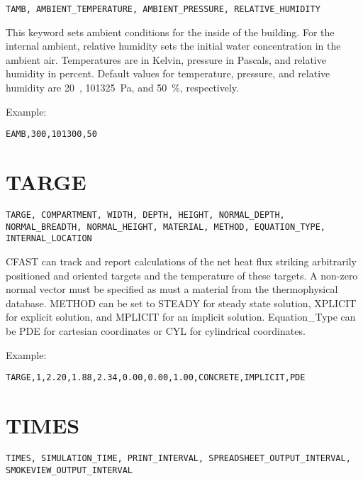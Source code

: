 \begin{lstlisting}
TAMB, AMBIENT_TEMPERATURE, AMBIENT_PRESSURE, RELATIVE_HUMIDITY
\end{lstlisting}

This keyword sets ambient conditions for the inside of the building. For the internal ambient, relative humidity sets the initial water concentration in the ambient air.  Temperatures are in Kelvin, pressure in Pascals, and relative humidity in percent. Default values for temperature, pressure, and relative humidity are 20~\degc, 101325~Pa, and 50~\%, respectively.

Example:

\begin{lstlisting}
EAMB,300,101300,50
\end{lstlisting}

\section{TARGE}

\begin{lstlisting}
TARGE, COMPARTMENT, WIDTH, DEPTH, HEIGHT, NORMAL_DEPTH, NORMAL_BREADTH, NORMAL_HEIGHT, MATERIAL, METHOD, EQUATION_TYPE, INTERNAL_LOCATION
\end{lstlisting}

CFAST can track and report calculations of the net heat flux striking arbitrarily positioned and oriented targets and the temperature of these targets. A non-zero normal vector must be specified as must a material from the thermophysical database. METHOD can be set to STEADY for steady state solution, XPLICIT for explicit solution, and MPLICIT for an implicit solution. Equation\_Type can be PDE for cartesian coordinates or CYL for cylindrical coordinates.

Example:

\begin{lstlisting}
TARGE,1,2.20,1.88,2.34,0.00,0.00,1.00,CONCRETE,IMPLICIT,PDE
\end{lstlisting}

\section{TIMES}

\begin{lstlisting}
TIMES, SIMULATION_TIME, PRINT_INTERVAL, SPREADSHEET_OUTPUT_INTERVAL, SMOKEVIEW_OUTPUT_INTERVAL
\end{lstlisting}

